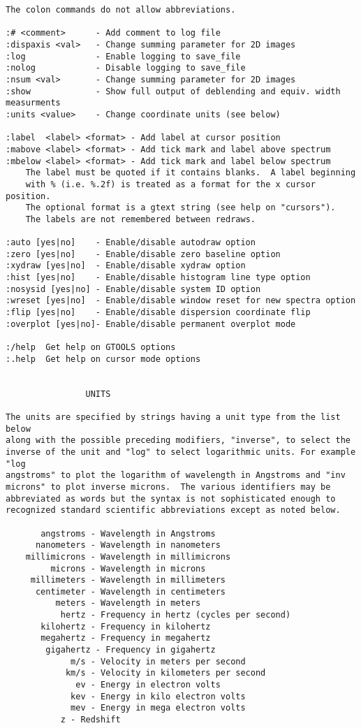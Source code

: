 \begin{verbatim}
The colon commands do not allow abbreviations.

:# <comment>      - Add comment to log file
:dispaxis <val>   - Change summing parameter for 2D images
:log	          - Enable logging to save_file
:nolog            - Disable logging to save_file 
:nsum <val>       - Change summing parameter for 2D images
:show	          - Show full output of deblending and equiv. width measurments
:units <value>	  - Change coordinate units (see below)

:label  <label> <format> - Add label at cursor position
:mabove <label> <format> - Add tick mark and label above spectrum
:mbelow <label> <format> - Add tick mark and label below spectrum
    The label must be quoted if it contains blanks.  A label beginning
    with % (i.e. %.2f) is treated as a format for the x cursor position.
    The optional format is a gtext string (see help on "cursors").
    The labels are not remembered between redraws.

:auto [yes|no]    - Enable/disable autodraw option
:zero [yes|no]    - Enable/disable zero baseline option
:xydraw [yes|no]  - Enable/disable xydraw option
:hist [yes|no]    - Enable/disable histogram line type option
:nosysid [yes|no] - Enable/disable system ID option
:wreset [yes|no]  - Enable/disable window reset for new spectra option
:flip [yes|no]    - Enable/disable dispersion coordinate flip
:overplot [yes|no]- Enable/disable permanent overplot mode

:/help  Get help on GTOOLS options
:.help	Get help on cursor mode options


				UNITS

The units are specified by strings having a unit type from the list below
along with the possible preceding modifiers, "inverse", to select the
inverse of the unit and "log" to select logarithmic units. For example "log
angstroms" to plot the logarithm of wavelength in Angstroms and "inv
microns" to plot inverse microns.  The various identifiers may be
abbreviated as words but the syntax is not sophisticated enough to
recognized standard scientific abbreviations except as noted below.

	   angstroms - Wavelength in Angstroms
	  nanometers - Wavelength in nanometers
	millimicrons - Wavelength in millimicrons
	     microns - Wavelength in microns
	 millimeters - Wavelength in millimeters
	  centimeter - Wavelength in centimeters
	      meters - Wavelength in meters
	       hertz - Frequency in hertz (cycles per second)
	   kilohertz - Frequency in kilohertz
	   megahertz - Frequency in megahertz
	    gigahertz - Frequency in gigahertz
	         m/s - Velocity in meters per second
	        km/s - Velocity in kilometers per second
	          ev - Energy in electron volts
	         kev - Energy in kilo electron volts
	         mev - Energy in mega electron volts
		   z - Redshift


\end{verbatim}
